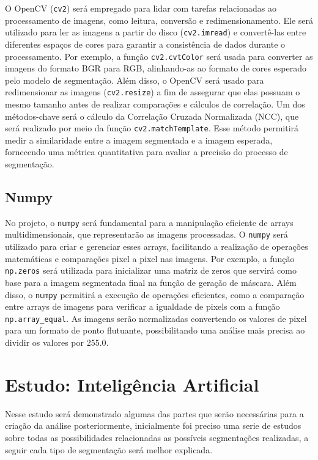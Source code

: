 O OpenCV (\texttt{cv2}) será empregado para lidar com tarefas relacionadas ao processamento de imagens, como leitura, conversão e redimensionamento.
Ele será utilizado para ler as imagens a partir do disco (\texttt{cv2.imread}) e convertê-las entre diferentes espaços de cores para garantir a consistência de dados durante o processamento. Por exemplo, a função \texttt{cv2.cvtColor} será usada para converter as imagens do formato BGR para RGB, alinhando-as ao formato de cores esperado pelo modelo de segmentação. Além disso, o OpenCV será usado para redimensionar as imagens (\texttt{cv2.resize}) a fim de assegurar que elas possuam o mesmo tamanho antes de realizar comparações e cálculos de correlação. Um dos métodos-chave será o cálculo da Correlação Cruzada Normalizada (NCC), que será realizado por meio da função \texttt{cv2.matchTemplate}. Esse método permitirá medir a similaridade entre a imagem segmentada e a imagem esperada, fornecendo uma métrica quantitativa para avaliar a precisão do processo de segmentação.

\subsection{Numpy}
No projeto, o \texttt{numpy} será fundamental para a manipulação eficiente de arrays multidimensionais, que representarão as imagens processadas. O \texttt{numpy} será utilizado para criar e gerenciar esses arrays, facilitando a realização de operações matemáticas e comparações pixel a pixel nas imagens. Por exemplo, a função \texttt{np.zeros} será utilizada para inicializar uma matriz de zeros que servirá como base para a imagem segmentada final na função de geração de máscara. Além disso, o \texttt{numpy} permitirá a execução de operações eficientes, como a comparação entre arrays de imagens para verificar a igualdade de pixels com a função \texttt{np.array\_equal}. As imagens serão normalizadas convertendo os valores de pixel para um formato de ponto flutuante, possibilitando uma análise mais precisa ao dividir os valores por 255.0.

\section{Estudo: Inteligência Artificial}
Nesse estudo será demonstrado algumas das partes que serão necessárias para a criação da análise posteriormente, 
inicialmente foi preciso uma serie de estudos sobre todas as possibilidades relacionadas as possíveis segmentações realizadas, 
a seguir cada tipo de segmentação será melhor explicada.

